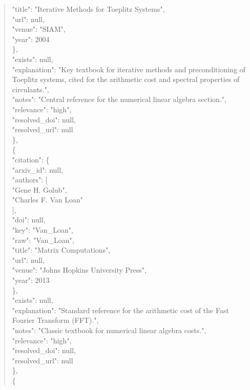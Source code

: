 \documentclass[11pt]{article}
\begin{document}
\begin{quote}
        "title": "Iterative Methods for Toeplitz Systems",\\
        "url": null,\\
        "venue": "SIAM",\\
        "year": 2004\\
      \},\\
      "exists": null,\\
      "explanation": "Key textbook for iterative methods and preconditioning of Toeplitz systems, cited for the arithmetic cost and spectral properties of circulants.",\\
      "notes": "Central reference for the numerical linear algebra section.",\\
      "relevance": "high",\\
      "resolved\_doi": null,\\
      "resolved\_url": null\\
    \},\\
    \{\\
      "citation": \{\\
        "arxiv\_id": null,\\
        "authors": [\\
          "Gene H. Golub",\\
          "Charles F. Van Loan"\\
        ],\\
        "doi": null,\\
        "key": "Van\_Loan",\\
        "raw": "Van\_Loan",\\
        "title": "Matrix Computations",\\
        "url": null,\\
        "venue": "Johns Hopkins University Press",\\
        "year": 2013\\
      \},\\
      "exists": null,\\
      "explanation": "Standard reference for the arithmetic cost of the Fast Fourier Transform (FFT).",\\
      "notes": "Classic textbook for numerical linear algebra costs.",\\
      "relevance": "high",\\
      "resolved\_doi": null,\\
      "resolved\_url": null\\
    \},\\
    \{\\

\end{quote}
\end{document}
